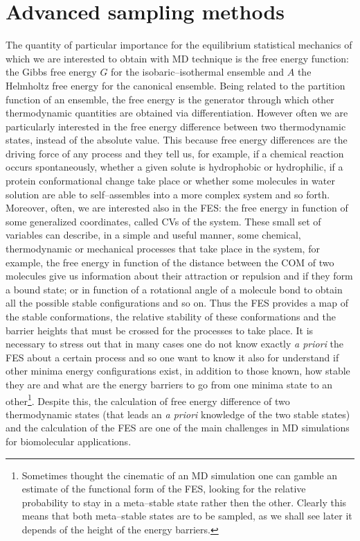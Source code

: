 \section{Advanced sampling methods}
The quantity of particular importance for the equilibrium statistical mechanics of which we are interested to obtain with \ac{MD} technique is the free energy function: the Gibbs free energy $G$ for the isobaric--isothermal ensemble and $A$ the Helmholtz free energy for the canonical ensemble. Being related to the partition function of an ensemble, the free energy is the generator through which other thermodynamic quantities are obtained via differentiation. However often we are particularly interested in the free energy difference between two thermodynamic states, instead of the absolute value. This because free energy differences are the driving force of any process and they tell us, for example, if a chemical reaction occurs spontaneously, whether a given solute is hydrophobic or hydrophilic, if a protein conformational change take place or whether some molecules in water solution are able to self--assembles into a more complex system and so forth. Moreover, often, we are interested also in the \ac{FES}: the free energy in function of some generalized coordinates, called \acp{CV} of the system. These small set of variables can describe, in a simple and useful manner, some chemical, thermodynamic or mechanical processes that take place in the system, for example, the free energy in function of the distance between the \ac{COM} of two molecules give us information about their attraction or repulsion and if they form a bound state; or in function of a rotational angle of a molecule bond to obtain all the possible stable configurations and so on. Thus the \ac{FES} provides a map of the stable conformations, the relative stability of these conformations and the barrier heights that must be crossed for the processes to take place. It is necessary to stress out that in many cases one do not know exactly \textit{a priori} the \ac{FES} about a certain process and so one want to know it also for understand if other minima energy configurations exist, in addition to those known, how stable they are and what are the energy barriers to go from one minima state to an other\footnote{Sometimes thought the cinematic of an \ac{MD} simulation one can gamble an estimate of the functional form of the \ac{FES}, looking for the relative probability to stay in a meta--stable state rather then the other. Clearly this means that both meta--stable states are to be sampled, as we shall see later it depends of the height of the energy barriers.}. 
Despite this, the calculation of free energy difference of two thermodynamic states (that leads an \textit{a priori} knowledge of the two stable states) and the calculation of the \ac{FES} are one of the main challenges in \ac{MD} simulations for biomolecular applications.

